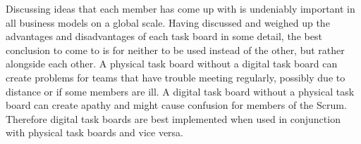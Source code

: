 \documentclass{scrartcl}
\begin{document}
Discussing ideas that each member has come up with is undeniably important in all business models on a global scale. Having discussed and weighed up the advantages and disadvantages of each task board in some detail, the best conclusion to come to is for neither to be used instead of the other, but rather alongside each other. A physical task board without a digital task board can create problems for teams that have trouble meeting regularly, possibly due to distance or if some members are ill. A digital task board without a physical task board can create apathy and might cause confusion for members of the Scrum. Therefore digital task boards are best implemented when used in conjunction with physical task boards and vice versa.



\end{document}
